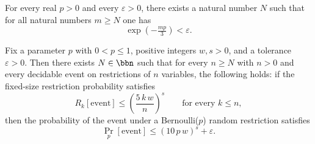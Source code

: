 \begin{lemma}
\label{BernoulliCost.exp_neg_eventually_small}
\leanok
{}
For every real $p > 0$ and every $\varepsilon > 0$, there exists a natural number $N$
such that for all natural numbers $m \ge N$ one has
\[
\exp\!\left(-\tfrac{mp}{3}\right) < \varepsilon.
\]
\end{lemma}

\begin{theorem}
\label{BernoulliCost.bernoulli_restriction_asymptotic}
\leanok
{}
Fix a parameter $p$ with $0 < p \le 1$, positive integers $w, s > 0$, and a tolerance
$\varepsilon > 0$. Then there exists $N \in \bbn$ such that for every $n \ge N$ with $n
> 0$ and every decidable event on restrictions of $n$ variables, the following holds: if
the fixed-size restriction probability satisfies
\[
R_k[\mathrm{event}] \le \left(\frac{5\,k\,w}{n}\right)^{s} \qquad \text{for every } k
\le n,
\]
then the probability of the event under a Bernoulli($p$) random restriction satisfies
\[
  \Pr_{p}[\mathrm{event}] \le (10\,p\,w)^{s} + \varepsilon.
\]
\end{theorem}
